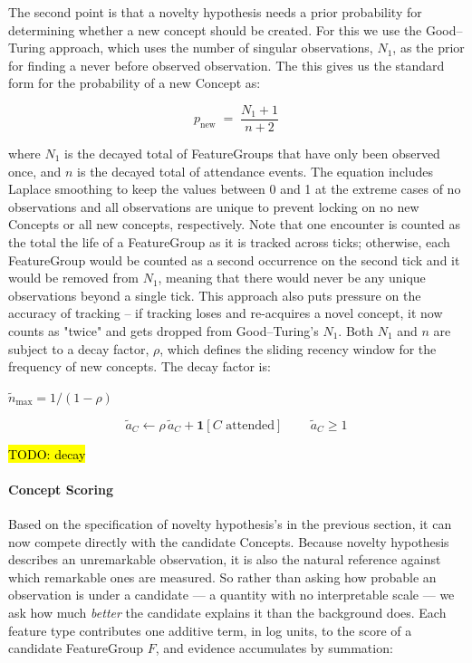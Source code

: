 \documentclass{article}
\begin{document}
The second point is that a novelty hypothesis needs a prior probability for determining whether a new concept should be created. For this we use the Good--Turing \cite{good_population_1953} approach, which uses the number of singular observations, $N_1$, as the prior for finding a never before observed observation. The this gives us the standard form for the probability of a new Concept as:

$$p_{\mathrm{new}} \;=\; \frac{N_1 + 1}{n + 2}$$

where $N_1$ is the decayed total of FeatureGroups that have only been observed once, and $n$ is the decayed total of attendance events. The equation includes Laplace smoothing to keep the values between 0 and 1 at the extreme cases of no observations and all observations are unique to prevent locking on no new Concepts or all new concepts, respectively. Note that one encounter is counted as the total the life of a FeatureGroup as it is tracked across ticks; otherwise, each FeatureGroup would be counted as a second occurrence on the second tick and it would be removed from $N_1$, meaning that there would never be any unique observations beyond a single tick. This approach also puts pressure on the accuracy of tracking -- if tracking loses and re-acquires a novel concept, it now counts as "twice" and gets dropped from Good--Turing's $N_1$. Both $N_1$ and $n$ are subject to a decay factor, $\rho$, which defines the sliding recency window for the frequency of new concepts. The decay factor is:

$\tilde{n}_{\max} = 1/(1-\rho)$

$$\tilde{a}_C \longleftarrow \rho\,\tilde{a}_C + \mathbf{1}[C \text{ attended}]\, \qquad \tilde{a}_C \geq 1$$

\hl{TODO: decay}

\paragraph{Concept Scoring}
Based on the specification of novelty hypothesis's in the previous section, it can now compete directly with the candidate Concepts. Because novelty hypothesis describes an unremarkable observation, it is also the natural reference against which remarkable ones are measured. So rather than asking how probable an observation is under a candidate --- a quantity with no interpretable scale --- we ask how much \emph{better} the candidate explains it than the background does. Each feature type contributes one additive term, in log units, to the score of a candidate FeatureGroup $F$, and evidence accumulates by summation:
\end{document}
